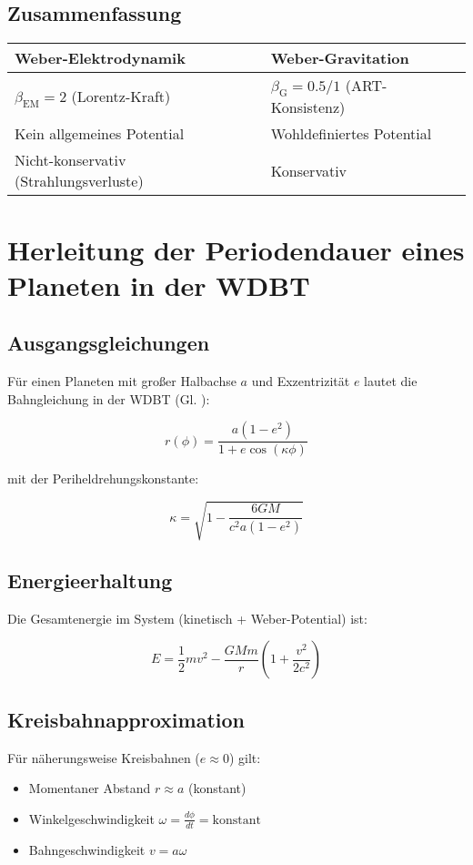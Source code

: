 \subsection*{Zusammenfassung}
\begin{tabular}{ll}
\textbf{Weber-Elektrodynamik} & \textbf{Weber-Gravitation} \\ \hline
$\beta_{\text{EM}} = 2$ (Lorentz-Kraft) & $\beta_{\text{G}} = 0.5/1$ (ART-Konsistenz) \\
Kein allgemeines Potential & Wohldefiniertes Potential \\
Nicht-konservativ (Strahlungsverluste) & Konservativ \\
\end{tabular}

\section{Herleitung der Periodendauer eines Planeten in der WDBT}
\label{sec:periodendauer}

\subsection*{Ausgangsgleichungen}
Für einen Planeten mit großer Halbachse \( a \) und Exzentrizität \( e \) lautet die Bahngleichung in der WDBT (Gl. ):

\begin{equation}
r(\phi) = \frac{a(1-e^2)}{1 + e \cos(\kappa \phi)}
\end{equation}

mit der Periheldrehungskonstante:

\begin{equation}
\kappa = \sqrt{1 - \frac{6GM}{c^2 a(1-e^2)}}
\end{equation}

\subsection*{Energieerhaltung}
Die Gesamtenergie im System (kinetisch + Weber-Potential) ist:

\begin{equation}
E = \frac{1}{2}mv^2 - \frac{GMm}{r}\left(1 + \frac{v^2}{2c^2}\right)
\end{equation}

\subsection*{Kreisbahnapproximation}
Für näherungsweise Kreisbahnen (\( e \approx 0 \)) gilt:
\begin{itemize}
\item Momentaner Abstand \( r \approx a \) (konstant)
\item Winkelgeschwindigkeit \( \omega = \frac{d\phi}{dt} = \text{konstant} \)
\item Bahngeschwindigkeit \( v = a\omega \)
\end{itemize}

